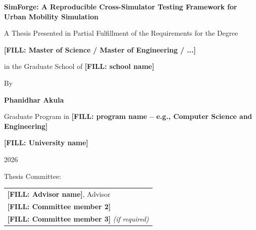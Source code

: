 
\begin{titlepage}
\centering

\vspace*{1in}

{\Large \bfseries SimForge: A Reproducible Cross-Simulator Testing Framework for Urban Mobility Simulation \par}

\vspace{1.5in}

A Thesis Presented in Partial Fulfillment of the Requirements for the Degree

\vspace{0.3in}

\textbf{[FILL: Master of Science / Master of Engineering / ...]}

\vspace{0.3in}

in the Graduate School of \textbf{[FILL: school name]}

\vspace{1in}

By

\vspace{0.3in}

{\large \bfseries Phanidhar Akula\par}

\vspace{0.3in}

Graduate Program in \textbf{[FILL: program name -- e.g., Computer Science and Engineering]}

\vspace{1in}

\textbf{[FILL: University name]}

\vspace{0.3in}

2026

\vspace{1in}

Thesis Committee:

\vspace{0.2in}

\begin{tabular}{l}
\textbf{[FILL: Advisor name]}, Advisor \\
\textbf{[FILL: Committee member 2]} \\
\textbf{[FILL: Committee member 3]} \textit{(if required)} \\
\end{tabular}

\end{titlepage}
